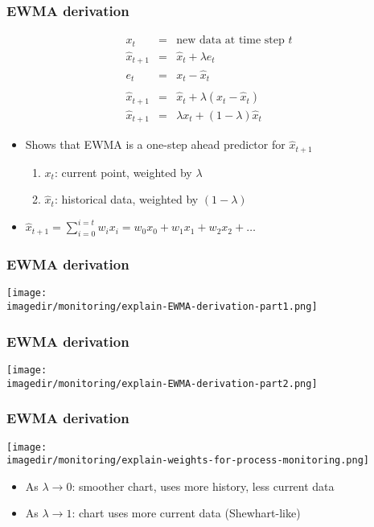 \begin{frame}\frametitle{EWMA derivation}

	$$
	\begin{array}{rcl}
		x_t &=& \text{new data at time step } t\\
		\hat{x}_{t+1} &=& \hat{x}_{t} + \lambda e_{t} \\
		e_t &=& x_t - \hat{x}_t \\
		\\
		\hat{x}_{t+1} &=& \hat{x}_{t} + \lambda \left(x_t - \hat{x}_t\right) \\
		\hat{x}_{t+1} &=& \lambda x_t + \left(1-\lambda \right)\hat{x}_{t}
	\end{array}
	$$
	
	\vspace{12pt}
	\begin{itemize}
		\item	Shows that EWMA is a one-step ahead predictor for $\hat{x}_{t+1}$
		\begin{enumerate}
			\item	$x_t$: current point, weighted by $\lambda$
			\item	$\hat{x}_{t}$: historical data, weighted by $\left(1-\lambda \right)$
		\end{enumerate}
	\end{itemize}
	\begin{itemize}
		\item	$\hat{x}_{t+1} = \sum_{i=0}^{i=t}{w_i x_i} = w_0x_0 + w_1x_1 + w_2x_2 + \ldots $
	\end{itemize}
\end{frame}

\begin{frame}\frametitle{EWMA derivation}
	\begin{center}
		\texttt{[image: \\imagedir/monitoring/explain-EWMA-derivation-part1.png]}
	\end{center}
\end{frame}

\begin{frame}\frametitle{EWMA derivation}
	\begin{center}
		\texttt{[image: \\imagedir/monitoring/explain-EWMA-derivation-part2.png]}
	\end{center}
\end{frame}

\begin{frame}\frametitle{EWMA derivation}
	\begin{center}
		\texttt{[image: \\imagedir/monitoring/explain-weights-for-process-monitoring.png]}
	\end{center}
	\vspace{-16pt}
	\begin{itemize}
		\item	As $\lambda \rightarrow 0$: smoother chart, uses more history, less current data
		\item	As $\lambda \rightarrow 1$: chart uses more current data (Shewhart-like)
	\end{itemize}
\end{frame}

